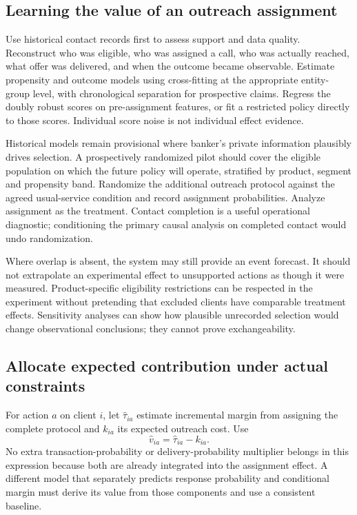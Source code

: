 \subsection{Learning the value of an outreach assignment}

Use historical contact records first to assess support and data quality. Reconstruct who was eligible, who was assigned a call, who was actually reached, what offer was delivered, and when the outcome became observable. Estimate propensity and outcome models using cross-fitting at the appropriate entity-group level, with chronological separation for prospective claims. Regress the doubly robust scores on pre-assignment features, or fit a restricted policy directly to those scores. Individual score noise is not individual effect evidence.

Historical models remain provisional where banker's private information plausibly drives selection. A prospectively randomized pilot should cover the eligible population on which the future policy will operate, stratified by product, segment and propensity band. Randomize the additional outreach protocol against the agreed usual-service condition and record assignment probabilities. Analyze assignment as the treatment. Contact completion is a useful operational diagnostic; conditioning the primary causal analysis on completed contact would undo randomization.

Where overlap is absent, the system may still provide an event forecast. It should not extrapolate an experimental effect to unsupported actions as though it were measured. Product-specific eligibility restrictions can be respected in the experiment without pretending that excluded clients have comparable treatment effects. Sensitivity analyses can show how plausible unrecorded selection would change observational conclusions; they cannot prove exchangeability.

\subsection{Allocate expected contribution under actual constraints}

For action $a$ on client $i$, let $\widehat\tau_{ia}$ estimate incremental margin from assigning the complete protocol and $k_{ia}$ its expected outreach cost. Use
\begin{equation}
 \widehat v_{ia}=\widehat\tau_{ia}-k_{ia}.
 \label{eq:action-value}
\end{equation}
No extra transaction-probability or delivery-probability multiplier belongs in this expression because both are already integrated into the assignment effect. A different model that separately predicts response probability and conditional margin must derive its value from those components and use a consistent baseline.

